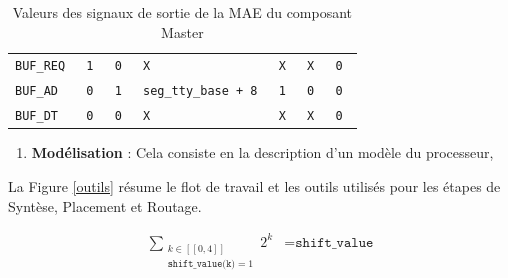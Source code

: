 \documentclass{article}
\begin{document}
\begin{table}[H]
\begin{tabular}{|l|l|l|l|l|l|l|}
\tt{BUF\_REQ}     & \tt{1}         & \tt{0}         & \tt{X}                  & \tt{X}             & \tt{X}         & \tt{0}         \\
\tt{BUF\_AD}      & \tt{0}         & \tt{1}         & \tt{seg\_tty\_base + 8} & \tt{1}             & \tt{0}         & \tt{0}         \\
\tt{BUF\_DT}      & \tt{0}         & \tt{0}         & \tt{X}                  & \tt{X}             & \tt{X}         & \tt{0}         \\
\hline
\end{tabular}
\endgroup
\caption{Valeurs des signaux de sortie de la MAE du composant Master}
\label{standard}
\end{table}




\begin{enumerate}
\item \textbf{Modélisation}  : Cela consiste en la description d'un modèle du processeur,
\end{enumerate}

La Figure \ref{outils} résume le flot de travail et les outils utilisés pour les étapes de Syntèse,
Placement et Routage.

\begin{eqnarray*}
  \sum_{\substack{k \in [[0, 4]] \\ \texttt{shift\_value(k)} = 1}} 2^k &= \texttt{shift\_value}
\end{eqnarray*}

%

\end{document}
